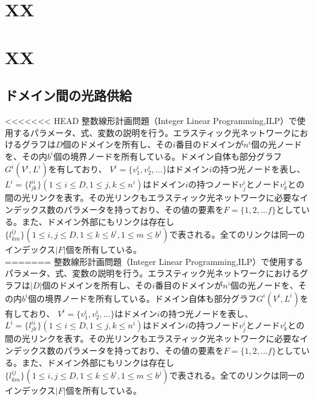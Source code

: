 \documentclass[a4j,twocolumn,fleqn]{jarticle}
\begin{document}
 
\Title
\section{XX}

\section{XX}
%
\subsection{ドメイン間の光路供給}
<<<<<<< HEAD
整数線形計画問題（Integer Linear Programming,ILP）で使用するパラメータ、式、変数の説明を行う。エラスティック光ネットワークにおけるグラフは$D$個のドメインを所有し、その$i$番目のドメインが$n^i$個の光ノードを、その内$b^i$個の境界ノードを所有している。ドメイン自体も部分グラフ$G^i (V^i ,L^i)$を有しており、 $V^i = \{v^i_1,v^i_2, \dots \} $はドメイン$i$の持つ光ノードを表し、$L^i = \{l^{ii}_{jk}\}(1\leq i \leq D,1\leq j,k \leq n^i)$はドメイン$i$の持つノード$v^i_j$とノード$v^i_k$との間の光リンクを表す。その光リンクもエラスティック光ネットワークに必要なインデックス数のパラメータを持っており、その値の要素を$F=\{1,2,\dots f\}$としている。また、ドメイン外部にもリンクは存在し$\{l^{ij}_{km}\}(1\leq i,j\leq D,1\leq k\leq b^i,1\leq m \leq b^j)$で表される。全てのリンクは同一のインデックス$|F|$個を所有している。\\
=======
整数線形計画問題（Integer Linear Programming,ILP）で使用するパラメータ、式、変数の説明を行う。エラスティック光ネットワークにおけるグラフは$|D|$個のドメインを所有し、その$i$番目のドメインが$n^i$個の光ノードを、その内$b^i$個の境界ノードを所有している。ドメイン自体も部分グラフ$G^i (V^i ,L^i)$を有しており、 $V^i = \{v^i_1,v^i_2, \dots \} $はドメイン$i$の持つ光ノードを表し、$L^i = \{l^{ii}_{jk}\}(1\leq i \leq D,1\leq j,k \leq n^i)$はドメイン$i$の持つノード$v^i_j$とノード$v^i_k$との間の光リンクを表す。その光リンクもエラスティック光ネットワークに必要なインデックス数のパラメータを持っており、その値の要素を$F=\{1,2,\dots f\}$としている。また、ドメイン外部にもリンクは存在し$\{l^{ij}_{km}\}(1\leq i,j\leq D,1\leq k\leq b^i,1\leq m \leq b^j)$で表される。全てのリンクは同一のインデックス$|F|$個を所有している。\\
\end{document}
